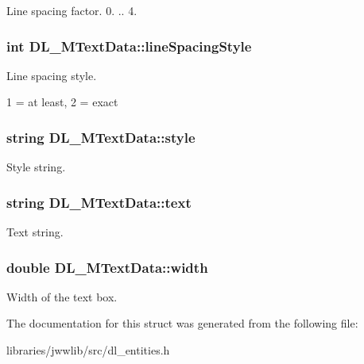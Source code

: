 Line spacing factor. 0. .. 4. \hypertarget{structDL__MTextData_a57e0ad2a5b31bb9148de0b265ac01a5c}{
\subsubsection[{line\-Spacing\-Style}]{\setlength{\rightskip}{0pt plus 5cm}int D\-L\-\_\-\-M\-Text\-Data\-::line\-Spacing\-Style}}\label{structDL__MTextData_a57e0ad2a5b31bb9148de0b265ac01a5c}
Line spacing style.

1 = at least, 2 = exact \hypertarget{structDL__MTextData_acd375b6bbc8d0eddafa39faf28ee1862}{
\subsubsection[{style}]{\setlength{\rightskip}{0pt plus 5cm}string D\-L\-\_\-\-M\-Text\-Data\-::style}}\label{structDL__MTextData_acd375b6bbc8d0eddafa39faf28ee1862}
Style string. \hypertarget{structDL__MTextData_a479b63c9fe89982988ddd337da37efb7}{
\subsubsection[{text}]{\setlength{\rightskip}{0pt plus 5cm}string D\-L\-\_\-\-M\-Text\-Data\-::text}}\label{structDL__MTextData_a479b63c9fe89982988ddd337da37efb7}
Text string. \hypertarget{structDL__MTextData_a8d9752165be599075d47a556523bd9ed}{
\subsubsection[{width}]{\setlength{\rightskip}{0pt plus 5cm}double D\-L\-\_\-\-M\-Text\-Data\-::width}}\label{structDL__MTextData_a8d9752165be599075d47a556523bd9ed}
Width of the text box. 

The documentation for this struct was generated from the following file\-:\begin{DoxyCompactItemize}
\item 
libraries/jwwlib/src/dl\-\_\-entities.\-h\end{DoxyCompactItemize}
